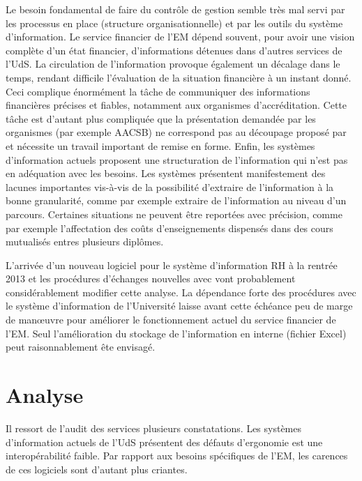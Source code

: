 \documentclass{book}
\begin{document}
Le besoin fondamental de faire du contrôle de gestion semble très mal
servi par les processus en place (structure organisationnelle) et par
les outils du système d'information. Le service financier de l'EM dépend
souvent, pour avoir une vision complète d'un état financier, d'informations
détenues dans d'autres services de l'UdS. La circulation de l'information
provoque également un décalage dans le temps, rendant difficile l'évaluation
de la situation financière à un instant donné. Ceci complique énormément
la tâche de communiquer des informations financières précises et fiables,
notamment aux organismes d'accréditation. Cette tâche est d'autant plus 
compliquée que la présentation demandée par les organismes (par exemple
AACSB) ne correspond pas au découpage proposé par  et 
nécessite un travail important de remise en forme.
Enfin, les systèmes d'information actuels proposent une structuration
de l'information qui n'est pas en adéquation avec les besoins. Les systèmes
présentent manifestement des lacunes importantes vis-à-vis de la possibilité
d'extraire de l'information à la bonne granularité, comme par exemple
extraire de l'information au niveau d'un parcours. Certaines situations
ne peuvent être reportées avec précision, comme par exemple l'affectation
des coûts d'enseignements dispensés dans des cours mutualisés entres plusieurs
diplômes.

L'arrivée d'un nouveau logiciel pour le système d'information RH à la 
rentrée 2013 et les procédures d'échanges nouvelles avec 
vont probablement considérablement modifier cette analyse. La dépendance
forte des procédures avec le système d'information de l'Université laisse
avant cette échéance peu de marge de man{\oe}uvre pour améliorer le 
fonctionnement actuel du service financier de l'EM. Seul l'amélioration
du stockage de l'information en interne (fichier Excel) peut raisonnablement
ête envisagé.





\chapter{Analyse}


Il ressort de l'audit des services plusieurs constatations. Les systèmes d'information
actuels de l'UdS présentent des défauts d'ergonomie est une interopérabilité faible.
Par rapport aux besoins spécifiques de l'EM, les carences de ces logiciels
sont d'autant plus criantes.
\end{document}
